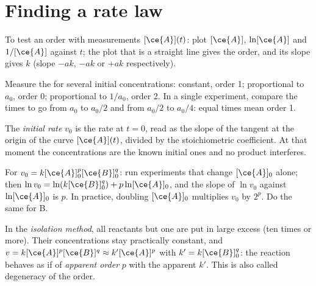 \section{Finding a rate law}

\begin{method}\label{met:b1:rate-laws:integral}
To test an order with measurements $[\ce{A}](t)$: plot $[\ce{A}]$,
$\ln[\ce{A}]$ and $1/[\ce{A}]$ against $t$; the plot that is a straight
line gives the order, and its slope gives $k$ (slope $-ak$, $-ak$ or $+ak$
respectively).
\end{method}

\begin{method}\label{met:b1:rate-laws:half-life}
Measure the  for several initial concentrations: constant,
order 1; proportional to $a_0$, order 0; proportional to $1/a_0$, order
2. In a single experiment, compare the times to go from $a_0$ to $a_0/2$
and from $a_0/2$ to $a_0/4$: equal times mean order 1.
\end{method}

\begin{definition}\label{def:b1:rate-laws:initial-rate}
The \emph{initial rate} $v_0$ is the rate at $t = 0$,
read as the slope of the tangent at the origin of the curve $[\ce{A}](t)$,
divided by the stoichiometric coefficient. At that moment the
concentrations are the known initial ones and no product interferes.
\end{definition}

\begin{method}\label{met:b1:rate-laws:initial-rates}
For $v_0 = k[\ce{A}]_0^p[\ce{B}]_0^q$: run experiments that change
$[\ce{A}]_0$ alone; then $\ln v_0 = \ln(k[\ce{B}]_0^q) + p\ln[\ce{A}]_0$,
and the slope of $\ln v_0$ against $\ln[\ce{A}]_0$ is $p$. In practice,
doubling $[\ce{A}]_0$ multiplies $v_0$ by $2^p$. Do the same for B.
\end{method}

\begin{definition}\label{def:b1:rate-laws:apparent-order}
In the \emph{isolation method}, all reactants but
one are put in large excess (ten times or more). Their concentrations stay
practically constant, and $v = k[\ce{A}]^p[\ce{B}]^q \approx k'[\ce{A}]^p$
with $k' = k[\ce{B}]_0^q$: the reaction behaves as if of
\emph{apparent order} $p$ with the apparent  $k'$. This is also called degeneracy of the order.
\end{definition}

